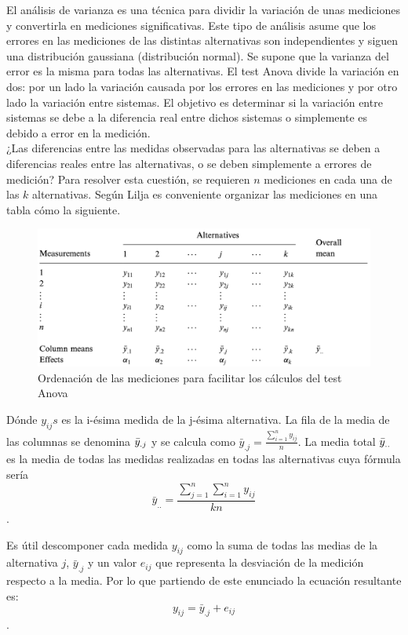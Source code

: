 El análisis de varianza es una técnica para dividir la variación de unas mediciones y convertirla en mediciones significativas. Este tipo de análisis asume que los errores en las mediciones de las distintas alternativas son independientes y siguen una distribución gaussiana (distribución normal). Se supone que la varianza del error es la misma para todas las alternativas. El test Anova divide la variación en dos: por un lado la variación causada por los errores en las mediciones y por otro lado la variación entre sistemas. El objetivo es determinar si la variación entre sistemas se debe a la diferencia real entre dichos sistemas o simplemente es debido a error en la medición. \cite{lilja_2000} \\

¿Las diferencias entre las medidas observadas para las alternativas se deben a diferencias reales entre las alternativas, o se deben simplemente a errores de medición? 
Para resolver esta cuestión, se requieren $n$ mediciones en cada una de las $k$ alternativas. Según Lilja \cite{lilja_2000} es conveniente organizar las mediciones en una tabla cómo la siguiente. 
 
\begin{figure}[H]
    \centering
    \includegraphics[scale=0.6]{doc/assets/images/Capitulo3/lilja_recommend.png}
    \caption{Ordenación de las mediciones para facilitar los cálculos del test Anova \cite{lilja_2000}}
    \label{fig:Anova_liljal}
\end{figure}

Dónde $y_{ij}s$ es la i-ésima medida de la j-ésima alternativa. La fila de la media de las columnas se denomina $\Bar{y}_{.j}$ y se calcula como $
\bar{y}_{. j}=\frac{\sum_{i=1}^{n} y_{i j}}{n}
$. La media total $\Bar{y}_{..}$ es la media de todas las medidas realizadas en todas las alternativas cuya fórmula sería $$
\bar{y}_{. .}=\frac{\sum_{j=1}^{n} \sum_{i=1}^{n} y_{i j}}{k n}
$$.

Es útil descomponer cada medida $y_{ij}$ como la suma de todas las medias de la alternativa $j$, $\bar{y}_{.j}$ y un valor $e_{ij}$ que representa la desviación de la medición respecto a la media. Por lo que partiendo de este enunciado la ecuación resultante es: $$y_{ij}=\bar{y}_{.j} + e_{ij}$$.

